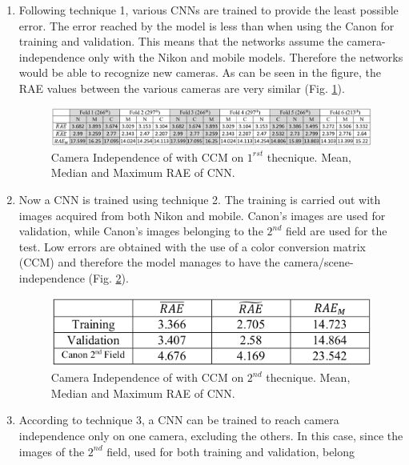 \begin{enumerate}
    \item Following technique 1, various CNNs are trained to provide the least 
    possible error. The error reached by the model is less than when using 
    the Canon for training and validation. This means that the networks 
    assume the camera-independence only with the Nikon and mobile models. 
    Therefore the networks would be able to recognize new cameras. As 
    can be seen in the figure, the RAE values between the various cameras 
    are very similar (Fig. \ref{fig:CNNtec1}).
    \begin{figure}[htbp]
        \centering
        \includegraphics[width = 1 \linewidth]{images/paper4/CNNtec1.png}
        \centering
        \caption{Camera Independence of \cite{0807099122} with CCM on $ 1^{rst} $ thecnique. Mean, Median and Maximum RAE of CNN.}
        \label{fig:CNNtec1}
    \end{figure}
    \item Now a CNN is trained using technique 2. The training is carried out 
    with images acquired from both Nikon and mobile. Canon's images are 
    used for validation, while Canon's images belonging to the $ 2^{nd} $ field 
    are used for the test. Low errors are obtained with the use of a color 
    conversion matrix (CCM) \cite{0807099129} and therefore the model manages to have 
    the camera/scene-independence (Fig. \ref{fig:CNNtec2}).
    \begin{figure}[h!]
        \centering
        \includegraphics[width = 0.6 \linewidth]{images/paper4/CNNtec2.png}
        \centering
        \caption{Camera Independence of \cite{0807099122} with CCM on $ 2^{nd} $ thecnique. Mean, Median and Maximum RAE of CNN.}
        \label{fig:CNNtec2}
    \end{figure}
    \item According to technique 3, a CNN can be trained to reach camera independence 
    only on one camera, excluding the others. In this case, since 
    the images of the $ 2^{nd} $ field, used for both training and validation, belong 

\end{enumerate}
